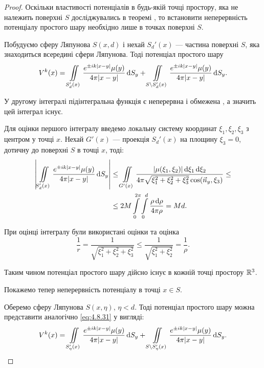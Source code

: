 \begin{proof}
	Оскільки властивості потенціалів в будь-якій точці простору, яка не належить поверхні $S$ досліджувались в теоремі , то встановити неперервність потенціалу простого шару необхідно лише в точках поверхні  $S$. \medskip

	Побудуємо сферу Ляпунова $S(x, d)$ і нехай $S_d'(x)$ --- частина поверхні $S$, яка знаходиться всередині сфери Ляпунова. Тоді потенціал простого шару 
	\begin{equation}
		\label{eq:4.8.31}
		V^k(x) = \displaystyle\iint\limits_{S_d'(x)} \frac{e^{\pm i k |x - y|} \mu(y)}{4 \pi |x - y|} \mathop{}\!\mathrm{d} S_y + \displaystyle\iint\limits_{S \setminus S_d'(x)} \frac{e^{\pm i k |x - y|} \mu(y)}{4 \pi |x - y|} \mathop{}\!\mathrm{d} S_y.
	\end{equation}

	У другому інтегралі підінтегральна функція є неперервна і обмежена , а значить цей інтеграл існує. \medskip

	Для оцінки першого інтегралу введемо локальну систему координат $\xi_1, \xi_2, \xi_3$ з центром у точці $x$. Нехай $G'(x)$ --- проекція $S_d'(x)$ на площину $\xi_3 = 0$, дотичну до поверхні $S$ в точці $x$, тоді:
	\begin{equation}
		\begin{aligned}
			\left| \displaystyle\iint\limits_{S_d'(x)} \frac{e^{\pm i k |x - y|} \mu(y)}{4 \pi |x - y|} \mathop{}\!\mathrm{d} S_y \right| &\le \displaystyle\iint\limits_{G'(x)} \frac{|\mu(\xi_1, \xi_2)| \mathop{}\!\mathrm{d} \xi_1 \mathop{}\!\mathrm{d} \xi_2}{4 \pi \sqrt{\xi_1^2 + \xi_2^2 + \xi_3^2} \cos(\vec n_y, \xi_3)} \le \\
			&\le 2 M \displaystyle\int\limits_0^{2\pi} \displaystyle\int\limits_0^d \frac{\rho \mathop{}\!\mathrm{d} \rho}{4 \pi \rho} = M d.
		\end{aligned}
	\end{equation}

	При оцінці інтегралу були використані оцінки  та оцінка
	\begin{equation}
		\frac{1}{r} = \frac{1}{\sqrt{\xi_1^2 + \xi_2^2 + \xi_3^2}} \le \frac{1}{\sqrt{\xi_1^2 + \xi_2^2}} = \frac{1}{\rho}.
	\end{equation}

	Таким чином потенціал простого шару дійсно існує в кожній точці простору $\mathbb{R}^3$. \medskip

	Покажемо тепер неперервність потенціалу в точці $x \in S$. \medskip

	Оберемо сферу Ляпунова $S(x, \eta)$, $\eta < d$. Тоді потенціал простого шару можна представити аналогічно \eqref{eq:4.8.31} у вигляді:
	\begin{equation}
		\label{eq:4.8.31'}
		V^k(x) = \displaystyle\iint\limits_{S_\eta'(x)} \frac{e^{\pm i k |x - y|} \mu(y)}{4 \pi |x - y|} \mathop{}\!\mathrm{d} S_y + \displaystyle\iint\limits_{S \setminus S_\eta'(x)} \frac{e^{\pm i k |x - y|} \mu(y)}{4 \pi |x - y|} \mathop{}\!\mathrm{d} S_y.
	\end{equation}


\end{proof}
